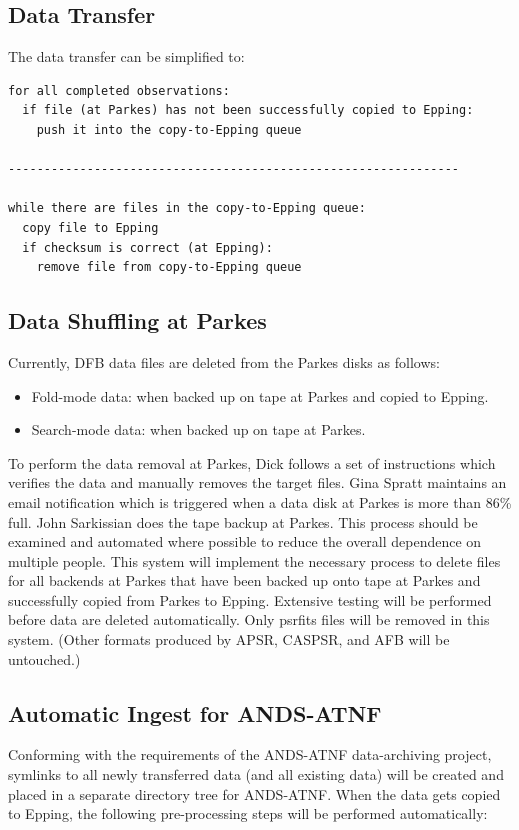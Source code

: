 \documentclass[a4paper,11pt]{article}
\begin{document}
\subsection{Data Transfer}

The data transfer can be simplified to:
\begin{verbatim}
for all completed observations: 
  if file (at Parkes) has not been successfully copied to Epping:
    push it into the copy-to-Epping queue

---------------------------------------------------------------

while there are files in the copy-to-Epping queue:
  copy file to Epping
  if checksum is correct (at Epping):
    remove file from copy-to-Epping queue
\end{verbatim}

\subsection{Data Shuffling at Parkes}
Currently, DFB data files are deleted from the Parkes disks as follows:
\begin{itemize}
\item Fold-mode data: when backed up on tape at Parkes and copied to Epping.
\item Search-mode data: when backed up on tape at Parkes.
\end{itemize}

To perform the data removal at Parkes, Dick follows a set of instructions which verifies the data and manually removes the target files. Gina Spratt maintains an email notification which is triggered when a data disk at Parkes is more than 86\% full. John Sarkissian does the tape backup at Parkes. This process should be examined and automated where possible to reduce the overall dependence on multiple people. This system will implement the necessary process to delete files for all backends at Parkes that have been backed up onto tape at Parkes and successfully copied from Parkes to Epping. Extensive testing will be performed before data are deleted automatically. Only psrfits files will be removed in this system. (Other formats produced by APSR, CASPSR, and AFB will be untouched.)

\subsection{Automatic Ingest for ANDS-ATNF}
Conforming with the requirements of the ANDS-ATNF data-archiving project, symlinks to all newly transferred data (and all existing data) will be created and placed in a separate directory tree for ANDS-ATNF. When the data gets copied to Epping, the following pre-processing steps will be performed automatically:
\end{document}
